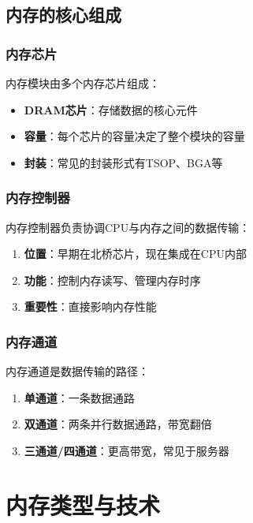 \documentclass[12pt,UTF8]{ctexbook}
\begin{document}
\chapter{内存的核心组成}

\section{内存芯片}

内存模块由多个内存芯片组成：

\begin{itemize}[leftmargin=2em]
    \item \textbf{DRAM芯片}：存储数据的核心元件
    \item \textbf{容量}：每个芯片的容量决定了整个模块的容量
    \item \textbf{封装}：常见的封装形式有TSOP、BGA等
\end{itemize}

\section{内存控制器}

内存控制器负责协调CPU与内存之间的数据传输：

\begin{enumerate}
    \item \textbf{位置}：早期在北桥芯片，现在集成在CPU内部
    \item \textbf{功能}：控制内存读写、管理内存时序
    \item \textbf{重要性}：直接影响内存性能
\end{enumerate}

\section{内存通道}

内存通道是数据传输的路径：

\begin{enumerate}
    \item \textbf{单通道}：一条数据通路
    \item \textbf{双通道}：两条并行数据通路，带宽翻倍
    \item \textbf{三通道/四通道}：更高带宽，常见于服务器
\end{enumerate}

\part{内存类型与技术}
\end{document}
